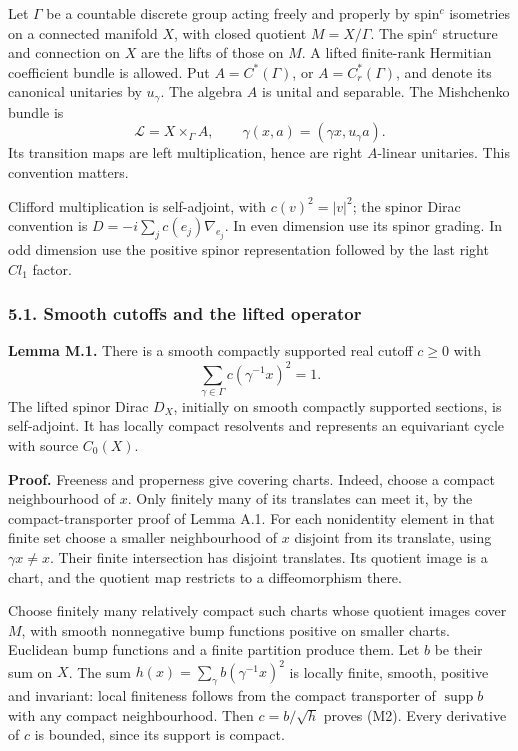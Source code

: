 \documentclass[
  11pt,
]{article}
\begin{document}
Let \(\Gamma\) be a countable discrete group acting freely and properly
by spin\(^{c}\) isometries on a connected manifold \(X\), with closed
quotient \(M=X/\Gamma\). The spin\(^{c}\) structure and connection on
\(X\) are the lifts of those on \(M\). A lifted finite-rank Hermitian
coefficient bundle is allowed. Put \(A=C^*(\Gamma)\), or
\(A=C_r^*(\Gamma)\), and denote its canonical unitaries by \(u_\gamma\).
The algebra \(A\) is unital and separable. The Mishchenko bundle is \[
\mathcal L=X\times_\Gamma A,\qquad
\gamma(x,a)=(\gamma x,u_\gamma a).
\tag{M1}
\] Its transition maps are left multiplication, hence are right
\(A\)-linear unitaries. This convention matters.

Clifford multiplication is self-adjoint, with \(c(v)^2=|v|^2\); the
spinor Dirac convention is \(D=-i\sum_jc(e_j)\nabla_{e_j}\). In even
dimension use its spinor grading. In odd dimension use the positive
spinor representation followed by the last right \(Cl_1\) factor.

\subsubsection{5.1. Smooth cutoffs and the lifted
operator}\label{smooth-cutoffs-and-the-lifted-operator}

\textbf{Lemma M.1.} There is a smooth compactly supported real cutoff
\(c\geq0\) with \[
\sum_{\gamma\in\Gamma}c(\gamma^{-1}x)^2=1.
\tag{M2}
\] The lifted spinor Dirac \(D_X\), initially on smooth compactly
supported sections, is self-adjoint. It has locally compact resolvents
and represents an equivariant cycle with source \(C_0(X)\).

\textbf{Proof.} Freeness and properness give covering charts. Indeed,
choose a compact neighbourhood of \(x\). Only finitely many of its
translates can meet it, by the compact-transporter proof of Lemma A.1.
For each nonidentity element in that finite set choose a smaller
neighbourhood of \(x\) disjoint from its translate, using
\(\gamma x\ne x\). Their finite intersection has disjoint translates.
Its quotient image is a chart, and the quotient map restricts to a
diffeomorphism there.

Choose finitely many relatively compact such charts whose quotient
images cover \(M\), with smooth nonnegative bump functions positive on
smaller charts. Euclidean bump functions and a finite partition produce
them. Let \(b\) be their sum on \(X\). The sum
\(h(x)=\sum_\gamma b(\gamma^{-1}x)^2\) is locally finite, smooth,
positive and invariant: local finiteness follows from the compact
transporter of \(\operatorname{supp}b\) with any compact neighbourhood.
Then \(c=b/\sqrt h\) proves (M2). Every derivative of \(c\) is bounded,
since its support is compact.
\end{document}
